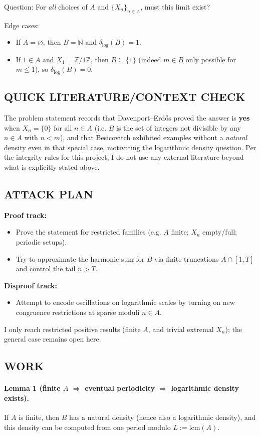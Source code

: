 Question: For \emph{all} choices of $A$ and $\{X_n\}_{n\in A}$, must this limit exist?

Edge cases:
\begin{itemize}
\item If $A=\varnothing$, then $B=\mathbb{N}$ and $\delta_{\log}(B)=1$.
\item If $1\in A$ and $X_1=\mathbb{Z}/1\mathbb{Z}$, then $B\subseteq\{1\}$ (indeed $m\in B$ only possible for $m\le 1$), so $\delta_{\log}(B)=0$.
\end{itemize}

\subsection*{QUICK LITERATURE/CONTEXT CHECK}
The problem statement records that Davenport--Erd\H{o}s proved the answer is \textbf{yes} when $X_n=\{0\}$ for all $n\in A$ (i.e. $B$ is the set of integers not divisible by any $n\in A$ with $n<m$), and that Besicovitch exhibited examples without a \emph{natural} density even in that special case, motivating the logarithmic density question.
Per the integrity rules for this project, I do not use any external literature beyond what is explicitly stated above.

\subsection*{ATTACK PLAN}
\textbf{Proof track:}
\begin{itemize}
\item Prove the statement for restricted families (e.g. $A$ finite; $X_n$ empty/full; periodic setups).
\item Try to approximate the harmonic sum for $B$ via finite truncations $A\cap[1,T]$ and control the tail $n>T$.
\end{itemize}
\textbf{Disproof track:}
\begin{itemize}
\item Attempt to encode oscillations on logarithmic scales by turning on new congruence restrictions at sparse moduli $n\in A$.
\end{itemize}
I only reach restricted positive results (finite $A$, and trivial extremal $X_n$); the general case remains open here.

\subsection*{WORK}
\paragraph{Lemma 1 (finite $A$ $\Rightarrow$ eventual periodicity $\Rightarrow$ logarithmic density exists).}
If $A$ is finite, then $B$ has a natural density (hence also a logarithmic density), and this density can be computed from one period modulo $L:=\mathrm{lcm}(A)$.

